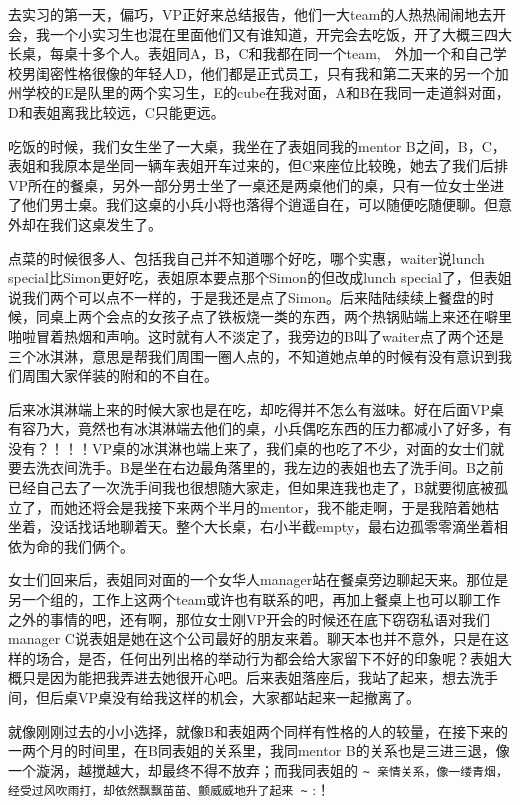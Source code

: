 \documentclass[12pt]{book}
\begin{document}
去实习的第一天，偏巧，VP正好来总结报告，他们一大team的人热热闹闹地去开会，我一个小实习生也混在里面他们又有谁知道，开完会去吃饭，开了大概三四大长桌，每桌十多个人。表姐同A，B，C和我都在同一个team,　外加一个和自己学校男闺密性格很像的年轻人D，他们都是正式员工，只有我和第二天来的另一个加州学校的E是队里的两个实习生，E的cube在我对面，A和B在我同一走道斜对面，D和表姐离我比较远，C只能更远。

吃饭的时候，我们女生坐了一大桌，我坐在了表姐同我的mentor B之间，B，C，表姐和我原本是坐同一辆车表姐开车过来的，但C来座位比较晚，她去了我们后排VP所在的餐桌，另外一部分男士坐了一桌还是两桌他们的桌，只有一位女士坐进了他们男士桌。我们这桌的小兵小将也落得个逍遥自在，可以随便吃随便聊。但意外却在我们这桌发生了。

点菜的时候很多人、包括我自己并不知道哪个好吃，哪个实惠，waiter说lunch special比Simon更好吃，表姐原本要点那个Simon的但改成lunch special了，但表姐说我们两个可以点不一样的，于是我还是点了Simon。后来陆陆续续上餐盘的时候，同桌上两个会点的女孩子点了铁板烧一类的东西，两个热锅贴端上来还在噼里啪啦冒着热烟和声响。这时就有人不淡定了，我旁边的B叫了waiter点了两个还是三个冰淇淋，意思是帮我们周围一圈人点的，不知道她点单的时候有没有意识到我们周围大家佯装的附和的不自在。

后来冰淇淋端上来的时候大家也是在吃，却吃得并不怎么有滋味。好在后面VP桌有容乃大，竟然也有冰淇淋端去他们的桌，小兵偶吃东西的压力都减小了好多，有没有？！！！VP桌的冰淇淋也端上来了，我们桌的也吃了不少，对面的女士们就要去洗衣间洗手。B是坐在右边最角落里的，我左边的表姐也去了洗手间。B之前已经自己去了一次洗手间我也很想随大家走，但如果连我也走了，B就要彻底被孤立了，而她还将会是我接下来两个半月的mentor，我不能走啊，于是我陪着她枯坐着，没话找话地聊着天。整个大长桌，右小半截empty，最右边孤零零滴坐着相依为命的我们俩个。

女士们回来后，表姐同对面的一个女华人manager站在餐桌旁边聊起天来。那位是另一个组的，工作上这两个team或许也有联系的吧，再加上餐桌上也可以聊工作之外的事情的吧，还有啊，那位女士刚VP开会的时候还在底下窃窃私语对我们manager C说表姐是她在这个公司最好的朋友来着。聊天本也并不意外，只是在这样的场合，是否，任何出列出格的举动行为都会给大家留下不好的印象呢？表姐大概只是因为能把我弄进去她很开心吧。后来表姐落座后，我站了起来，想去洗手间，但后桌VP桌没有给我这样的机会，大家都站起来一起撤离了。

就像刚刚过去的小小选择，就像B和表姐两个同样有性格的人的较量，在接下来的一两个月的时间里，在B同表姐的关系里，我同mentor B的关系也是三进三退，像一个漩涡，越搅越大，却最终不得不放弃；而我同表姐的 \verb,~ 亲情关系，像一缕青烟，经受过风吹雨打，却依然飘飘苗苗、颤威威地升了起来 ~, :！
\end{document}
